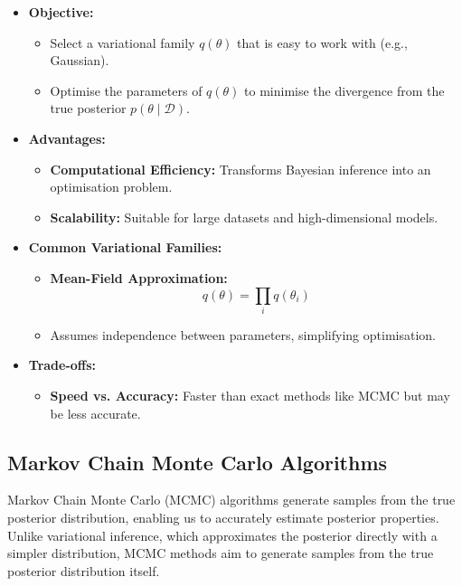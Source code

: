 \begin{itemize}
    \item \textbf{Objective:}
          \begin{itemize}
              \item Select a variational family $q(\theta)$ that is easy to work with (e.g., Gaussian).
              \item Optimise the parameters of $q(\theta)$ to minimise the divergence from the true posterior $p(\theta \mid \mathcal{D})$.
          \end{itemize}
    \item \textbf{Advantages:}
          \begin{itemize}
              \item \textbf{Computational Efficiency:} Transforms Bayesian inference into an optimisation problem.
              \item \textbf{Scalability:} Suitable for large datasets and high-dimensional models.
          \end{itemize}
    \item \textbf{Common Variational Families:}
          \begin{itemize}
              \item \textbf{Mean-Field Approximation:}
                    \[
                        q(\theta) = \prod_i q(\theta_i)
                    \]
              \item Assumes independence between parameters, simplifying optimisation.
          \end{itemize}
    \item \textbf{Trade-offs:}
          \begin{itemize}
              \item \textbf{Speed vs. Accuracy:} Faster than exact methods like MCMC but may be less accurate.
          \end{itemize}
\end{itemize}

\subsection{Markov Chain Monte Carlo Algorithms}

Markov Chain Monte Carlo (MCMC) algorithms generate samples from the true posterior distribution, enabling us to accurately estimate posterior properties. Unlike variational inference, which approximates the posterior directly with a simpler distribution, MCMC methods aim to generate samples from the true posterior distribution itself.

